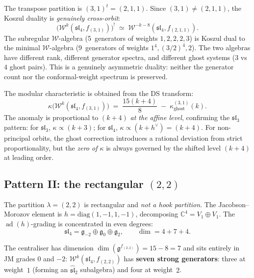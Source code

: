 \documentclass[11pt]{article}
\newcommand{\cW}{\mathcal{W}}
\newcommand{\fg}{\mathfrak{g}}
\newcommand{\fsl}{\mathfrak{sl}}
\newcommand{\C}{\mathbb{C}}
\newcommand{\ad}{\operatorname{ad}}
\begin{document}
\begin{observation}
\label{obs:sl4-31-koszul-wn}
The transpose partition is $(3,1)^t = (2,1,1)$.  Since
$(3,1) \neq (2,1,1)$, the Koszul duality is \emph{genuinely
cross-orbit}:
\[
\bigl(\cW^k(\fsl_4, f_{(3,1)})\bigr)^!
\;\simeq\;
\cW^{-k-8}(\fsl_4, f_{(2,1,1)}).
\]
The subregular $\cW$-algebra (5~generators of weights $1,2,2,2,3$) is
Koszul dual to the minimal $\cW$-algebra (9~generators of weights
$1^4, (3/2)^4, 2$).  The two algebras have different rank, different
generator spectra, and different ghost systems ($3$ vs $4$ ghost pairs).
This is a genuinely asymmetric duality: neither the generator count
nor the conformal-weight spectrum is preserved.
\end{observation}

\begin{observation}
\label{obs:sl4-31-kappa-wn}
The modular characteristic is obtained from the DS transform:
\[
\kappa\bigl(\cW^k(\fsl_4, f_{(3,1)})\bigr)
\;=\;
\frac{15(k+4)}{8}
\;-\;
\kappa_{\mathrm{ghost}}^{(3,1)}(k).
\]
The anomaly is proportional to $(k+4)$ \emph{at the affine level},
confirming the $\fsl_3$ pattern: for $\fsl_3$, $\kappa \propto (k+3)$;
for $\fsl_4$, $\kappa \propto (k+h^\vee) = (k+4)$.
For non-principal orbits, the ghost correction introduces a rational
deviation from strict proportionality, but the
\emph{zero of $\kappa$} is always governed by the shifted level
$(k+4)$ at leading order.
\end{observation}

\subsection{Pattern II: the rectangular $(2,2)$}
\label{subsec:sl4-hook-22-wn}

\begin{observation}
\label{obs:sl4-22-data-wn}
The partition $\lambda = (2,2)$ is rectangular and
\emph{not a hook partition}.  The Jacobson--Morozov element is
$h = \mathrm{diag}(1,-1,1,-1)$, decomposing $\C^4 = V_1 \oplus V_1$.
The $\ad(h)$-grading is concentrated in even degrees:
\[
\fsl_4 = \fg_{-2} \oplus \fg_0 \oplus \fg_2,
\qquad
\dim = 4 + 7 + 4.
\]

The centraliser has dimension $\dim(\fg^{f_{(2,2)}}) = 15 - 8 = 7$
and sits entirely in JM grades $0$ and $-2$:
$\cW^k(\fsl_4, f_{(2,2)})$ has
\textbf{seven strong generators}: three at weight~$1$ (forming an
$\widehat{\fsl}_2$ subalgebra) and four at weight~$2$.
\end{observation}
\end{document}
